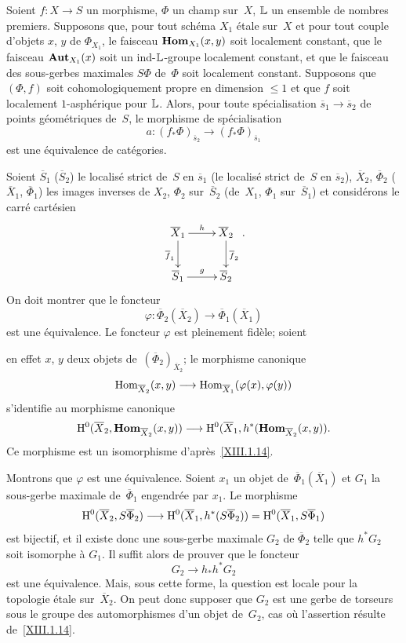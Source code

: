 \begin{corollaire}
\label{XIII.1.15}
Soient $f \colon X \to S$ un morphisme, $\Phi$ un champ sur~$X$, $\mathbb{L}$
un ensemble de nombres premiers. Supposons que, pour tout sch\'ema
$X_1$ \'etale sur~$X$ et pour tout couple d'objets $x$, $y$ de
$\Phi_{X_1}$, le faisceau $\operatorname{\mathbf{Hom}}_{X_1}(x,y)$ soit localement
constant, que le faisceau $\operatorname{\mathbf{Aut}}_{X_1}(x)$ soit un
ind-$\mathbb{L}$-groupe localement constant, et que le faisceau des
sous-gerbes maximales $S\Phi$ de~$\Phi$ \textup{\cite[III 2.1.7]{XIII.1}} soit localement
constant. Supposons que $(\Phi,f)$ soit cohomologiquement propre en
dimension $\leqslant 1$ et que $f$ soit localement $1$-asph\'erique
pour $\mathbb{L}$. Alors, pour toute sp\'ecialisation $\overline{s}_1 \to
\overline{s}_2$ de points g\'eom\'etriques de~$S$, le morphisme de
sp\'ecialisation
$$
a \colon (f_* \Phi)_{\overline{s}_2} \to (f_*
\Phi)_{\overline{s}_1}
$$
est une \'equivalence de cat\'egories.
\end{corollaire}

Soient $\overline{S}_1$ (\resp $\overline{S}_2$) le localis\'e
strict de~$S$ en $\overline{s}_1$ (\resp le localis\'e strict de~$S$
en $\overline{s}_2$), $\overline{X}_2$, $\overline{\Phi}_2$
(\resp $\overline{X}_1$, $\overline{\Phi}_1$) les images inverses de
$X_2$, $\Phi_2$ sur~$\overline{S}_2$ (\resp de~$X_1$, $\Phi_1$ sur~$\overline{S}_1$) et consid\'erons le carr\'e cart\'esien
$$
\xymatrix{{\overline{X}_1}\ar[r]^h\ar[d]_{\overline{f}_1}&{\overline{X}_2}\ar[d]^{\overline{f}_2}\\{\overline{S}_1}\ar[r]^g&{\overline{S}_2}}
\text{.}
$$
On doit montrer que le foncteur
$$
\varphi \colon \overline{\Phi}_2(\overline{X}_2) \to \overline{\Phi}_1
(\overline{X}_1)
$$
est une \'equivalence. Le foncteur $\varphi$ est pleinement
fid\`ele; soient

en
effet $x$, $y$ deux objets de~$(\overline{\Phi}_2)_{\overline{X}_2}$;
le morphisme canonique
$$
\Hom_{\overline{X}_2}(x,y) \to
\Hom_{\overline{X}_1}(\varphi(x),\varphi(y))
$$
s'identifie au morphisme canonique
$$
\H^0(\overline{X}_2, \SheafHom_{\overline{X}_2}(x,y)) \to
\H^0(\overline{X}_1,h^*(\SheafHom_{\overline{X}_2}(x,y)) \text{.}
$$
Ce morphisme est un isomorphisme d'apr\`es~\ref{XIII.1.14}.

Montrons que $\varphi$ est une \'equivalence. Soient $x_1$ un objet
de~$\overline{\Phi}_1(\overline{X}_1)$ et $G_1$ la sous-gerbe maximale
de~$\overline{\Phi}_1$ engendr\'ee par $x_1$. Le morphisme
$$
\H^0(\overline{X}_2, S\overline{\Phi}_2) \to \H^0(\overline{X}_1,
h^*(S \overline{\Phi}_2)) =
\H^0(\overline{X}_1,S\overline{\Phi}_1)
$$
est bijectif, et il existe donc une sous-gerbe maximale $G_2$ de
$\overline{\Phi}_2$ telle que $h^* G_2$ soit isomorphe \`a
$G_1$. Il suffit alors de prouver que le foncteur
$$
G_2 \to h_* h^* G_2
$$
est une \'equivalence. Mais, sous cette forme, la question est
locale pour la topologie \'etale sur~$\overline{X}_2$. On peut donc
supposer que $G_2$ est une gerbe de torseurs sous le groupe des
automorphismes d'un objet de~$G_2$, cas o\`u l'assertion r\'esulte
de~\ref{XIII.1.14}.

